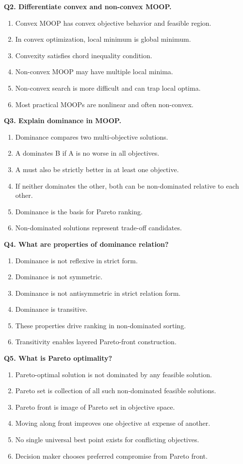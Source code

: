 \documentclass[11pt,a4paper]{article}
\begin{document}
\textbf{Q2. Differentiate convex and non-convex MOOP.}
\begin{enumerate}
\item Convex MOOP has convex objective behavior and feasible region.
\item In convex optimization, local minimum is global minimum.
\item Convexity satisfies chord inequality condition.
\item Non-convex MOOP may have multiple local minima.
\item Non-convex search is more difficult and can trap local optima.
\item Most practical MOOPs are nonlinear and often non-convex.
\end{enumerate}

\textbf{Q3. Explain dominance in MOOP.}
\begin{enumerate}
\item Dominance compares two multi-objective solutions.
\item A dominates B if A is no worse in all objectives.
\item A must also be strictly better in at least one objective.
\item If neither dominates the other, both can be non-dominated relative to each other.
\item Dominance is the basis for Pareto ranking.
\item Non-dominated solutions represent trade-off candidates.
\end{enumerate}

\textbf{Q4. What are properties of dominance relation?}
\begin{enumerate}
\item Dominance is not reflexive in strict form.
\item Dominance is not symmetric.
\item Dominance is not antisymmetric in strict relation form.
\item Dominance is transitive.
\item These properties drive ranking in non-dominated sorting.
\item Transitivity enables layered Pareto-front construction.
\end{enumerate}

\textbf{Q5. What is Pareto optimality?}
\begin{enumerate}
\item Pareto-optimal solution is not dominated by any feasible solution.
\item Pareto set is collection of all such non-dominated feasible solutions.
\item Pareto front is image of Pareto set in objective space.
\item Moving along front improves one objective at expense of another.
\item No single universal best point exists for conflicting objectives.
\item Decision maker chooses preferred compromise from Pareto front.
\end{enumerate}
\end{document}
